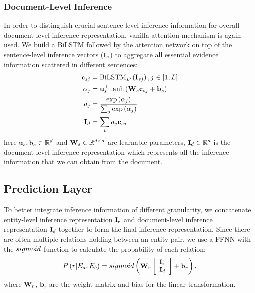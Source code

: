 \documentclass[runningheads]{llncs}
\begin{document}
\subsubsection{Document-Level Inference}
In order to distinguish crucial sentence-level inference information for overall document-level inference representation,
vanilla attention  mechanism is again used.
We build a BiLSTM followed by the attention network on top of the sentence-level inference vectors ($\small \textbf{I}_{s}$) to aggregate all essential evidence information scattered in different sentences:
\begin{align}
\small
\textbf{c}_{s j}&=\mathrm{BiLSTM}_{D}\left(\textbf{I}_{s j}\right), j \in[1, L] \\
\alpha_{j}&=\textbf{u}_{s}^{\top} \tanh \left(\textbf{W}_{s} \textbf{c}_{s j}+\textbf{b}_{s}\right) \\
a_{j}&=\frac{\exp \left(\alpha_{j}\right)}{\sum_{j} \exp \left(\alpha_{j}\right)} \\
\textbf{I}_{d}&=\sum_{t} a_{j} \textbf{c}_{s j}	
\end{align}
here $\small \textbf{u}_{s}, \textbf{b}_{s} \in \mathbb{R}^{d}$ and $\small \textbf{W}_{s} \in \mathbb{R}^{d\times d}$ are learnable parameters,
$\small \textbf{I}_{d} \in \mathbb{R}^{d}$ is the document-level inference representation which represents all the inference information that we can obtain from the document.

\subsection{Prediction Layer}
To better integrate inference information of different granularity, 
we concatenate entity-level inference representation $\small \textbf{I}_{e}$ and document-level inference representation $\small \textbf{I}_{d}$ together to form the final inference representation.
Since there are often multiple relations holding between an entity pair, we use a FFNN with the $\small sigmoid$ function to calculate the probability of each relation:
\begin{equation}
\small
P\left(r | E_{a}, E_{b}\right)=sigmoid \left(\textbf{W}_{r} \left[\begin{array}{l}{\textbf{I}_{e}} \\ {\textbf{I}_{d}}\end{array}\right]+\textbf{b}_{r}\right).
\end{equation}
where $\small \textbf{W}_{r}$, $\textbf{b}_{r}$ are the weight matrix and bias for the linear transformation.
\end{document}
